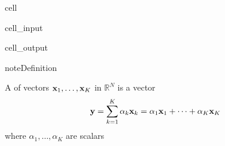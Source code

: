 \documentclass[letterpaper,10pt,english]{jupyterBook}
\begin{document}
\begin{sphinxuseclass}{cell}\begin{sphinxVerbatimInput}

\begin{sphinxuseclass}{cell_input}
\begin{sphinxVerbatim}[commandchars=\\\{\}]
   
    
    
   

  \PYG{p}{[}  \PYG{p}{]}
   
\end{sphinxVerbatim}

\end{sphinxuseclass}\end{sphinxVerbatimInput}
\begin{sphinxVerbatimOutput}

\begin{sphinxuseclass}{cell_output}
\begin{sphinxVerbatim}[commandchars=\\\{\}]
[12 14 16]
[24 28 32]
\end{sphinxVerbatim}

\end{sphinxuseclass}\end{sphinxVerbatimOutput}

\end{sphinxuseclass}
\begin{sphinxadmonition}{note}{Definition}

\sphinxAtStartPar
A  of vectors \({\bf x}_1,\ldots, {\bf x}_K\) in \(\mathbb{R}^N\)
is a vector
\begin{equation*}
\begin{split}
%
{\bf y} = \sum_{k=1}^K \alpha_k {\bf x}_k 
= \alpha_1 {\bf x}_1 + \cdots + \alpha_K {\bf x}_K 
%
\end{split}
\end{equation*}
\sphinxAtStartPar
where \(\alpha_1,\ldots, \alpha_K\) are scalars
\end{sphinxadmonition}
\end{document}
